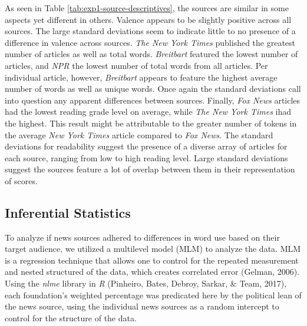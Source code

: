 \documentclass[english,,man]{apa6}
\begin{document}
As seen in Table \ref{tab:exp1-source-descriptives}, the sources are
similar in some aspects yet different in others. Valence appears to be
slightly positive across all sources. The large standard deviations seem
to indicate little to no presence of a difference in valence across
sources. \emph{The New York Times} published the greatest number of
articles as well as total words. \emph{Breitbart} featured the lowest
number of articles, and \emph{NPR} the lowest number of total words from
all articles. Per individual article, however, \emph{Breitbart} appears
to feature the highest average number of words as well as unique words.
Once again the standard deviations call into question any apparent
differences between sources. Finally, \emph{Fox News} articles had the
lowest reading grade level on average, while \emph{The New York Times}
ihad the highest. This result might be attributable to the greater
number of tokens in the average \emph{New York Times} article compared
to \emph{Fox News}. The standard deviations for readability suggest the
presence of a diverse array of articles for each source, ranging from
low to high reading level. Large standard deviations suggest the sources
feature a lot of overlap between them in their representation of scores.

\subsection{Inferential Statistics}\label{inferential-statistics}

To analyze if news sources adhered to differences in word use based on
their target audience, we utilized a multilevel model (MLM) to analyze
the data. MLM is a regression technique that allows one to control for
the repeated measurement and nested structured of the data, which
creates correlated error (Gelman, 2006). Using the \emph{nlme} library
in \emph{R} (Pinheiro, Bates, Debroy, Sarkar, \& Team, 2017), each
foundation's weighted percentage was predicated here by the political
lean of the news source, using the individual news sources as a random
intercept to control for the structure of the data.
\end{document}
